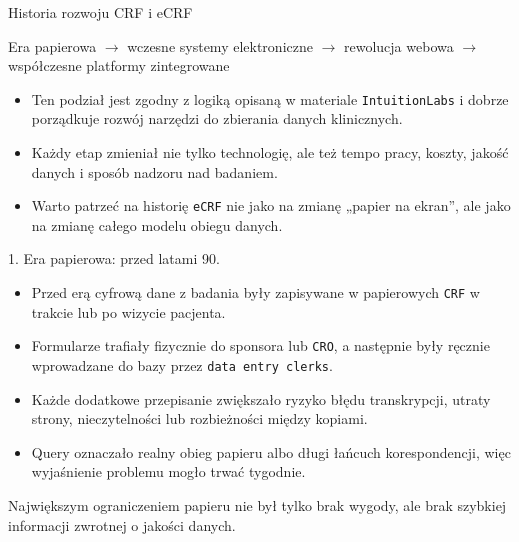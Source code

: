 \begin{frame}{Historia rozwoju CRF i eCRF}
  \begin{center}
    \Large
    Era papierowa $\rightarrow$ wczesne systemy elektroniczne $\rightarrow$ rewolucja webowa $\rightarrow$ współczesne platformy zintegrowane
  \end{center}

  \vspace{0.45cm}

  \begin{itemize}
    \item Ten podział jest zgodny z logiką opisaną w materiale \texttt{IntuitionLabs} i dobrze porządkuje rozwój narzędzi do zbierania danych klinicznych.
    \item Każdy etap zmieniał nie tylko technologię, ale też tempo pracy, koszty, jakość danych i sposób nadzoru nad badaniem.
    \item Warto patrzeć na historię \texttt{eCRF} nie jako na zmianę „papier na ekran”, ale jako na zmianę całego modelu obiegu danych.
  \end{itemize}
\end{frame}

\begin{frame}{1. Era papierowa: przed latami 90.}
  \begin{itemize}
    \item Przed erą cyfrową dane z badania były zapisywane w papierowych \texttt{CRF} w trakcie lub po wizycie pacjenta.
    \item Formularze trafiały fizycznie do sponsora lub \texttt{CRO}, a następnie były ręcznie wprowadzane do bazy przez \texttt{data entry clerks}.
    \item Każde dodatkowe przepisanie zwiększało ryzyko błędu transkrypcji, utraty strony, nieczytelności lub rozbieżności między kopiami.
    \item Query oznaczało realny obieg papieru albo długi łańcuch korespondencji, więc wyjaśnienie problemu mogło trwać tygodnie.
  \end{itemize}

  \vspace{0.25cm}

  \begin{WarningBox}
    Największym ograniczeniem papieru nie był tylko brak wygody, ale brak szybkiej informacji zwrotnej o jakości danych.
  \end{WarningBox}
\end{frame}

